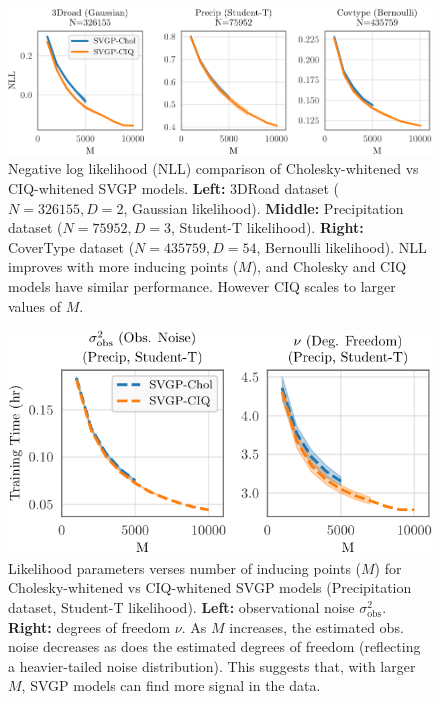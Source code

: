 \begin{figure}[t!]
  \centering
  \includegraphics[width=\linewidth]{figures/variational_nll.pdf}
  \caption[Negative log likelihood (NLL) comparison of Cholesky-whitened vs CIQ-whitened SVGP models.]{
    Negative log likelihood (NLL) comparison of Cholesky-whitened vs CIQ-whitened SVGP models.
    {\bf Left:} 3DRoad dataset ($N=326155, D=2$, Gaussian likelihood).
    {\bf Middle:} Precipitation dataset ($N=75952, D=3$, Student-T likelihood).
    {\bf Right:} CoverType dataset ($N=435759, D=54$, Bernoulli likelihood).
    NLL improves with more inducing points ($M$), and Cholesky and CIQ models have similar performance.
    However CIQ scales to larger values of $M$.
  }
  \label{fig:variational_nll}
\end{figure}

\begin{figure}[t!]
  \centering
  \includegraphics[width=0.7\linewidth]{figures/variational_stats.pdf}
  \caption[Likelihood parameters verses number of inducing points ($M$) for Cholesky-whitened vs CIQ-whitened SVGP models.]{
    Likelihood parameters verses number of inducing points ($M$) for Cholesky-whitened vs CIQ-whitened SVGP models (Precipitation dataset, Student-T likelihood).
    {\bf Left:} observational noise $\sigma^2_\text{obs}$.
    {\bf Right:} degrees of freedom $\nu$.
    As $M$ increases, the estimated obs. noise decreases as does the estimated degrees of freedom (reflecting a heavier-tailed noise distribution).
    This suggests that, with larger $M$, SVGP models can find more signal in the data.
  }
  \label{fig:variational_stats}
\end{figure}
